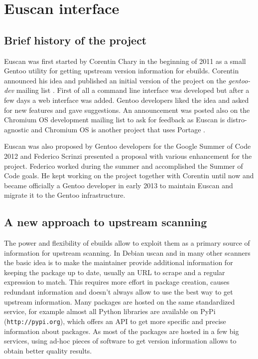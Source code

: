 \chapter{Euscan interface}

\section{Brief history of the project}

Euscan was first started by Corentin Chary in the beginning of 2011 as a small Gentoo utility for getting upstream version information for ebuilds. Corentin announced his idea and published an initial version of the project on the \emph{gentoo-dev} mailing list \cite{euscan_announcement}.
First of all a command line interface was developed but after a few days a web interface was added. Gentoo developers liked the idea and asked for new features and gave suggestions. An announcement was posted also on the Chromium OS development mailing list to ask for feedback as Euscan is distro-agnostic and Chromium OS is another project that uses Portage \cite{euscan_chromium}.

Euscan was also proposed by Gentoo developers for the Google Summer of Code 2012 and Federico Scrinzi presented a proposal with various enhancement for the project. Federico worked during the summer and accomplished the Summer of Code goals. He kept working on the project together with Corentin until now and became officially a Gentoo developer in early 2013 to maintain Euscan and migrate it to the Gentoo infrastructure.


\section{A new approach to upstream scanning}
The power and flexibility of ebuilds allow to exploit them as a primary source of information for upstream scanning. In Debian uscan and in many other scanners the basic idea is to make the maintainer provide additional information for keeping the package up to date, usually an URL to scrape and a regular expression to match. This requires more effort in package creation, causes redundant information and doesn't always allow to use the best way to get upstream information. Many packages are hosted on the same standardized service, for example almost all Python libraries are available on PyPi (\texttt{http://pypi.org}), which offers an API to get more specific and precise information about packages. As most of the packages are hosted in a few big services, using ad-hoc pieces of software to get version information allows to obtain better quality results.

